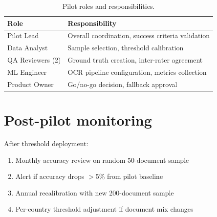 \begin{table}[htbp]
\centering
\caption{Pilot roles and responsibilities.}
\label{tab:pilot-roles}
\footnotesize
\begin{tabularx}{\linewidth}{@{}l X@{}}
\toprule
\textbf{Role} & \textbf{Responsibility} \\ \midrule
Pilot Lead & Overall coordination, success criteria validation \\
Data Analyst & Sample selection, threshold calibration \\
QA Reviewers (2) & Ground truth creation, inter-rater agreement \\
ML Engineer & OCR pipeline configuration, metrics collection \\
Product Owner & Go/no-go decision, fallback approval \\
\bottomrule
\end{tabularx}
\end{table}

\section{Post-pilot monitoring}

After threshold deployment:
\begin{enumerate}
  \item Monthly accuracy review on random 50-document sample
  \item Alert if accuracy drops $>$5\% from pilot baseline
  \item Annual recalibration with new 200-document sample
  \item Per-country threshold adjustment if document mix changes
\end{enumerate}